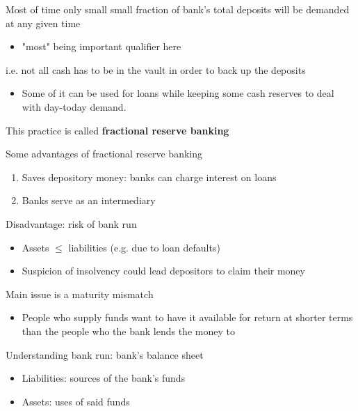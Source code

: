 \documentclass{beamer}
\begin{document}
\begin{frame}
 Most of time only small small fraction of bank's total deposits will be demanded at any given time
 \begin{itemize}
   \item "most" being important qualifier here
 \end{itemize}
 i.e. not all cash has to be in the vault in order to back up the deposits
 \begin{itemize}
   \item Some of it can be used for loans while keeping some cash reserves to deal with day-today demand. 
 \end{itemize}
This practice is called \textbf{fractional reserve banking }
\end{frame}

\begin{frame}
 Some advantages of fractional reserve banking
\begin{enumerate}
  \item Saves depository money: banks can charge interest on loans
  \item Banks serve as an intermediary  
\end{enumerate}
 \medskip
 Disadvantage: risk of bank run
 \begin{itemize}
   \item Assets $\leq$ liabilities (e.g. due to loan defaults)
   \item Suspicion of insolvency could lead depositors to claim their money
 \end{itemize}
 \medskip
 Main issue is a maturity mismatch
 \begin{itemize}
   \item People who supply funds want to have it available for return at shorter terms than the people who the bank lends the money to
 \end{itemize}
\end{frame}

\begin{frame}
 Understanding bank run: bank's balance sheet 
\begin{itemize}
  \item Liabilities: sources of the bank's funds
  \item Assets: uses of said funds
\end{itemize}
\end{frame}
\end{document}
